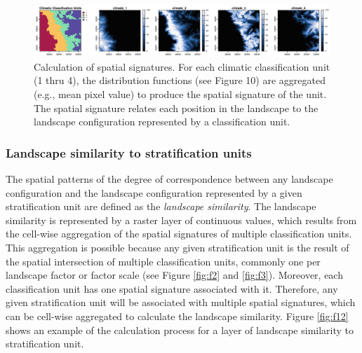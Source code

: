 \begin{figure}[H]

{\centering \includegraphics[width=1\linewidth,height=0.1\textheight]{figures/figure_10} 

}

\caption{Calculation of spatial signatures. For each climatic classification unit (1 thru 4), the distribution functions (see Figure 10) are aggregated (e.g., mean pixel value) to produce the spatial signature of the unit. The spatial signature relates each position in the landscape to the landscape configuration represented by a classification unit.}\label{fig:f11}
\end{figure}

\hypertarget{landscape-similarity-to-stratification-units}{%
\subsubsection{Landscape similarity to stratification units}\label{landscape-similarity-to-stratification-units}}

The spatial patterns of the degree of correspondence between any landscape
configuration and the landscape configuration represented by a given
stratification unit are defined as the \emph{landscape similarity}. The landscape
similarity is represented by a raster layer of continuous values, which results
from the cell-wise aggregation of the spatial signatures of multiple
classification units. This aggregation is possible because any given
stratification unit is the result of the spatial intersection of multiple
classification units, commonly one per landscape factor or factor scale (see
Figure \ref{fig:f2} and \ref{fig:f3}). Moreover, each classification unit has
one spatial signature associated with it. Therefore, any given stratification
unit will be associated with multiple spatial signatures, which can be cell-wise
aggregated to calculate the landscape similarity. Figure \ref{fig:f12} shows an
example of the calculation process for a layer of landscape similarity to
stratification unit.

